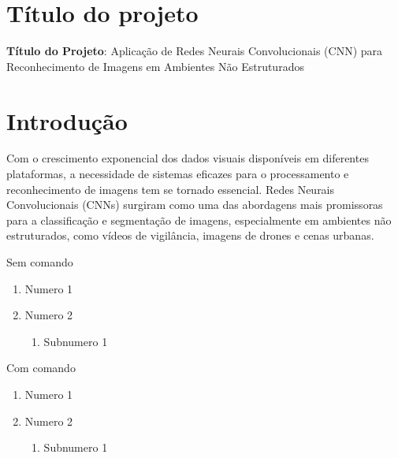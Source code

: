 \section{Título do projeto}
\textbf{Título do Projeto}: Aplicação de Redes Neurais Convolucionais (CNN) para Reconhecimento de Imagens em Ambientes Não Estruturados

\section{Introdução}
Com o crescimento exponencial dos dados visuais disponíveis em diferentes plataformas, a necessidade de sistemas eficazes para o processamento e reconhecimento de imagens tem se tornado essencial. Redes Neurais Convolucionais (CNNs) surgiram como uma das abordagens mais promissoras para a classificação e segmentação de imagens, especialmente em ambientes não estruturados, como vídeos de vigilância, imagens de drones e cenas urbanas.

Sem comando
\begin{enumerate}
    \item Numero 1
    \item Numero 2
    \begin{enumerate}
        \item Subnumero 1
    \end{enumerate}
\end{enumerate}

\renewcommand{\labelenumii}{\arabic{enumi}.\arabic{enumii}}

Com comando

\begin{enumerate}
    \item Numero 1
    \item Numero 2
    \begin{enumerate}
        \item Subnumero 1
    \end{enumerate}
\end{enumerate}
